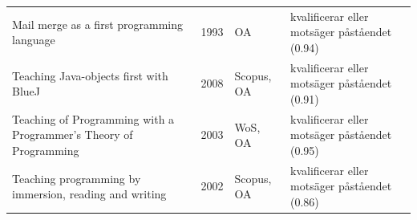 \begin{longtable}{@{}%
  >{\raggedright\arraybackslash}p{}c%
  >{\raggedright\arraybackslash}p{}%
  >{\raggedright\arraybackslash}p{}@{}}
Mail merge as a first programming language & 1993 & OA & kvalificerar eller motsäger påståendet (0.94) \\
Teaching Java-objects first with BlueJ & 2008 & Scopus, OA & kvalificerar eller motsäger påståendet (0.91) \\
Teaching of Programming with a Programmer's Theory of Programming & 2003 & WoS, OA & kvalificerar eller motsäger påståendet (0.95) \\
Teaching programming by immersion, reading and writing & 2002 & Scopus, OA & kvalificerar eller motsäger påståendet (0.86) \\
\end{longtable}
\endgroup
